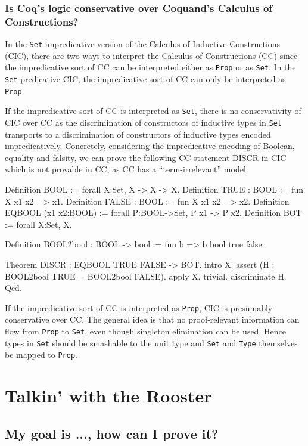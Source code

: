 \documentclass[a4paper,pdftex]{article}
\def\Question#1{\stepcounter{question}\subsubsection{#1}}
\def\Type{{\tt Type}}
\def\Prop{{\tt Prop}}
\def\Set{{\tt Set}}
\begin{document}
\Question{Is Coq's logic conservative over Coquand's Calculus of 
Constructions?}

In the {\Set}-impredicative version of the Calculus of Inductive
Constructions (CIC), there are two ways to interpret the Calculus of
Constructions (CC) since the impredicative sort of CC can be
interpreted either as {\Prop} or as {\Set}. In the {\Set}-predicative
CIC, the impredicative sort of CC can only be interpreted as {\Prop}.

If the impredicative sort of CC is interpreted as {\Set}, there is no
conservativity of CIC over CC as the discrimination of
constructors of inductive types in {\Set} transports to a
discrimination of constructors of inductive types encoded
impredicatively. Concretely, considering the impredicative encoding of
Boolean, equality and falsity, we can prove the following CC statement
DISCR in CIC which is not provable in CC, as CC has a
``term-irrelevant'' model.

\begin{coq_example*}
Definition BOOL := forall X:Set, X -> X -> X.
Definition TRUE : BOOL := fun X x1 x2 => x1.
Definition FALSE : BOOL := fun X x1 x2 => x2.
Definition EQBOOL (x1 x2:BOOL) := forall P:BOOL->Set, P x1 -> P x2.
Definition BOT := forall X:Set, X.

Definition BOOL2bool : BOOL -> bool := fun b => b bool true false.

Theorem DISCR : EQBOOL TRUE FALSE -> BOT.
intro X.
assert (H : BOOL2bool TRUE = BOOL2bool FALSE).
{ apply X. trivial. }
discriminate H.
Qed.
\end{coq_example*}

If the impredicative sort of CC is interpreted as {\Prop}, CIC is
presumably conservative over CC. The general idea is that no
proof-relevant information can flow from {\Prop} to {\Set}, even
though singleton elimination can be used. Hence types in {\Set} should
be smashable to the unit type and {\Set} and {\Type} themselves be
mapped to {\Prop}.

\section{Talkin' with the Rooster}


\subsection{My goal is ...,  how can I prove it?}
\end{document}
